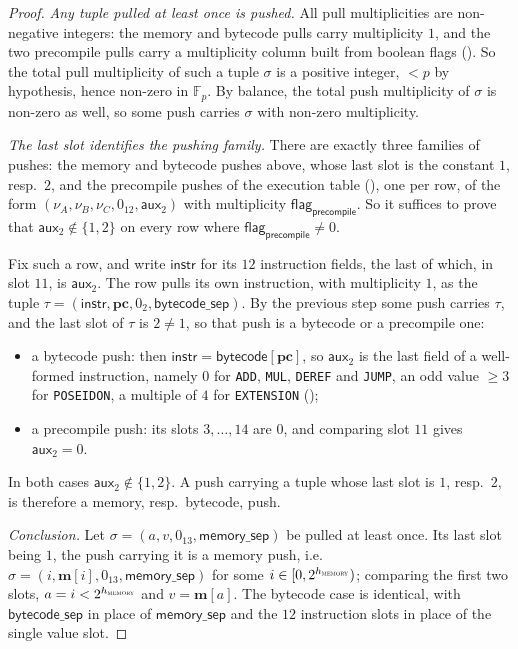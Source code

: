 \documentclass{article}
\theoremstyle{definition}
\newcommand{\Fp}{\mathbb F_p}
\begin{document}
\begin{proof}
\emph{Any tuple pulled at least once is pushed.} All pull multiplicities are non-negative integers: the memory and bytecode pulls carry multiplicity $1$, and the two precompile pulls carry a multiplicity column built from boolean flags (). So the total pull multiplicity of such a tuple $\sigma$ is a positive integer, $< p$ by hypothesis, hence non-zero in $\Fp$. By balance, the total push multiplicity of $\sigma$ is non-zero as well, so some push carries $\sigma$ with non-zero multiplicity.

\emph{The last slot identifies the pushing family.} There are exactly three families of pushes: the memory and bytecode pushes above, whose last slot is the constant $1$, resp.\ $2$, and the precompile pushes of the execution table (), one per row, of the form $(\nu_A, \nu_B, \nu_C, 0_{12}, \textsf{aux}_2)$ with multiplicity $\textsf{flag}_\textsf{precompile}$. So it suffices to prove that $\textsf{aux}_2 \notin \{1, 2\}$ on every row where $\textsf{flag}_\textsf{precompile} \neq 0$.

Fix such a row, and write $\textsf{instr}$ for its $12$ instruction fields, the last of which, in slot $11$, is $\textsf{aux}_2$. The row pulls its own instruction, with multiplicity $1$, as the tuple $\tau = (\textsf{instr}, \textbf{pc}, 0_2, \textsf{bytecode\_sep})$. By the previous step some push carries $\tau$, and the last slot of $\tau$ is $2 \neq 1$, so that push is a bytecode or a precompile one:
\begin{itemize}
    \item a bytecode push: then $\textsf{instr} = \textsf{bytecode}[\textbf{pc}]$, so $\textsf{aux}_2$ is the last field of a well-formed instruction, namely $0$ for \texttt{ADD}, \texttt{MUL}, \texttt{DEREF} and \texttt{JUMP}, an odd value $\geq 3$ for \texttt{POSEIDON}, a multiple of $4$ for \texttt{EXTENSION} ();
    \item a precompile push: its slots $3, \ldots, 14$ are $0$, and comparing slot $11$ gives $\textsf{aux}_2 = 0$.
\end{itemize}
In both cases $\textsf{aux}_2 \notin \{1, 2\}$. A push carrying a tuple whose last slot is $1$, resp.\ $2$, is therefore a memory, resp.\ bytecode, push.

\emph{Conclusion.} Let $\sigma = (a, v, 0_{13}, \textsf{memory\_sep})$ be pulled at least once. Its last slot being $1$, the push carrying it is a memory push, i.e.\ $\sigma = (i, \textbf{m}[i], 0_{13}, \textsf{memory\_sep})$ for some $i \in [0, 2^{h_\textsc{memory}})$; comparing the first two slots, $a = i < 2^{h_\textsc{memory}}$ and $v = \textbf{m}[a]$. The bytecode case is identical, with $\textsf{bytecode\_sep}$ in place of $\textsf{memory\_sep}$ and the $12$ instruction slots in place of the single value slot.
\end{proof}
\end{document}
